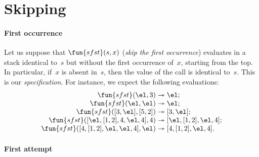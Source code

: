 \section{Skipping}
\label{sec:skipping}

\paragraph{First occurrence}
\label{def:linear_search}

Let us suppose that \(\fun{sfst}(s,x)\)
(\emph{skip the first occurrence}) evaluates in a stack identical
to~\(s\) but without the first occurrence of~\(x\), starting from the
top. In particular, if~\(x\) is absent in~\(s\), then the value of the
call is identical to~\(s\). This is our
\emph{specification}. For instance, we expect the
following evaluations:\label{sfst_ex}
\begin{equation*}
\begin{array}{r@{\;}l@{\;}l}
\fun{sfst}(\el,3) & \twoheadrightarrow & \el;\\
\fun{sfst}(\el,\el) & \twoheadrightarrow & \el;\\
\fun{sfst}([3,\el],[5,2]) & \twoheadrightarrow & [3,\el];\\
\fun{sfst}([\el,[1,2],4,\el,4],4) & \twoheadrightarrow &
  [\el,[1,2],\el,4];\\
\fun{sfst}([4,[1,2],\el,\el,4],\el)
 & \twoheadrightarrow & [4,[1,2],\el,4].
\end{array}
\end{equation*}

\paragraph{First attempt}

